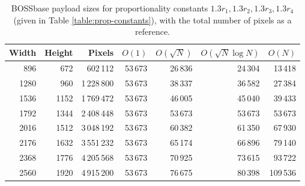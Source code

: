 \documentclass[11pt,a4paper,twoside,openright]{report}
\begin{document}
\begin{appendices}
\begin{table}[htbp]
\begin{center}
\begin{tabular}{ | r r | r | r r r r | }
\hline
Width & Height & Pixels & $O(1)$ & $O(\sqrt{N})$ & $O(\sqrt{N} \log N)$ & $O(N)$ \\ \hline
896 & 672 & 602\,112 & 53\,673 & 26\,836 & 24\,304 & 13\,418 \\
1280 & 960 & 1\,228\,800 & 53\,673 & 38\,337 & 36\,582 & 27\,384 \\
1536 & 1152 & 1\,769\,472 & 53\,673 & 46\,005 & 45\,040 & 39\,433 \\
1792 & 1344 & 2\,408\,448 & 53\,673 & 53\,673 & 53\,673 & 53\,673 \\
2016 & 1512 & 3\,048\,192 & 53\,673 & 60\,382 & 61\,350 & 67\,930 \\
2176 & 1632 & 3\,551\,232 & 53\,673 & 65\,174 & 66\,896 & 79\,140 \\
2368 & 1776 & 4\,205\,568 & 53\,673 & 70\,925 & 73\,615 & 93\,722 \\
2560 & 1920 & 4\,915\,200 & 53\,673 & 76\,675 & 80\,398 & 109\,536 \\ \hline
\end{tabular}
\caption{BOSSbase payload sizes for proportionality constants $1.3 r_1, 1.3 r_2, 1.3 r_3, 1.3 r_4$ (given in Table \ref{table:prop-constants}), with the total number of pixels as a reference.}
\end{center}
\end{table}


\end{appendices}
\end{document}
